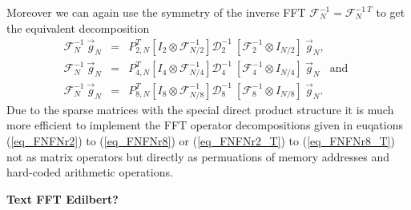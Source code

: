 Moreover we can again use the symmetry of the inverse FFT 
$\mathcal{F}^{-1}_{N} = \mathcal{F}^{-1 \ T}_{N}$ to get the
equivalent decomposition
\begin{eqnarray}  \label{eq_FNFNr2_Tinverse}
 \mathcal{F}^{-1}_{N} \ \vec{g}_{N}
  &=&
 P^{T}_{2,N}
 \left[I_{2} \otimes \mathcal{F}^{-1}_{N/2} \right]
 \mathcal{D}^{-1}_{2} \ 
 \left[\mathcal{F}^{-1}_{2} \otimes I_{N/2} \right] \ 
 \vec{g}_{N},
  \\ \label{eq_FNFNr4_Tinverse}
 \mathcal{F}^{-1}_{N} \ \vec{g}_{N}
  &=&
 P^{T}_{4,N}
 \left[I_{4} \otimes \mathcal{F}^{-1}_{N/4} \right] 
 \mathcal{D}^{-1}_{4} \ 
 \left[\mathcal{F}^{-1}_{4} \otimes I_{N/4} \right] \ 
 \vec{g}_{N}
 \ \ \ \ \mbox{and} \ \
  \\ \label{eq_FNFNr8_Tinverse}
 \mathcal{F}^{-1}_{N} \ \vec{g}_{N}
  &=&
  P^{T}_{8,N}
 \left[I_{8} \otimes \mathcal{F}^{-1}_{N/8} \right]
 \mathcal{D}^{-1}_{8} \
 \left[\mathcal{F}^{-1}_{8} \otimes I_{N/8} \right] \ 
 \vec{g}_{N}.
\end{eqnarray}
Due to the sparse matrices with the special direct product structure 
it is much more efficient to implement the FFT operator decompositions 
given in euqations 
(\ref{eq_FNFNr2}) to (\ref{eq_FNFNr8}) or (\ref{eq_FNFNr2_T}) to
(\ref{eq_FNFNr8_T}) not as matrix operators but directly as permuations
of memory addresses and hard-coded arithmetic operations.

\vspace{0.5cm}
{\large \bf Text FFT Edilbert?}
%
